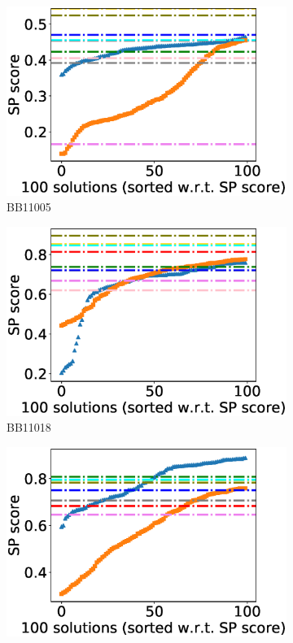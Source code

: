 \begin{figure}[!htbp]
\begin{adjustwidth}{-1cm}{-1cm}
\begin{subfigure}{0.26\textwidth}
			\includegraphics[width=\columnwidth]{Figure/summary/precomputedInit/Balibase/BB11005_pairs_density_single_run_2}
			\caption{BB11005}
\end{subfigure}    
		\begin{subfigure}{0.26\textwidth}
			\includegraphics[width=\columnwidth]{Figure/summary/precomputedInit/Balibase/BB11018_pairs_density_single_run_2}
			\caption{BB11018}
\end{subfigure}
		\begin{subfigure}{0.26\textwidth}
			\includegraphics[width=\columnwidth]{Figure/summary/precomputedInit/Balibase/BB11020_pairs_density_single_run_2}

\end{subfigure}
\end{adjustwidth}
\end{figure}
